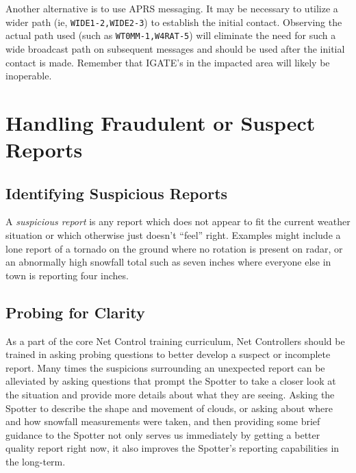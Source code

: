 \documentclass[pdflatex,letterpaper,twoside,12pt]{book}
\begin{document}
Another alternative is to use APRS messaging.  It may be necessary to utilize a wider path (ie, \verb|WIDE1-2,WIDE2-3|) to establish the initial contact.  Observing the actual path used (such as \verb|WT0MM-1,W4RAT-5|) will eliminate the need for such a wide broadcast path on subsequent messages and should be used after the initial contact is made.  Remember that IGATE's in the impacted area will likely be inoperable.


\section{Handling Fraudulent or Suspect Reports}

\subsection{Identifying Suspicious Reports}

A \emph{suspicious report} is any report which does not appear to fit the current weather situation or which otherwise just doesn't ``feel'' right.  Examples might include a lone report of a tornado on the ground where no rotation is present on radar, or an abnormally high snowfall total such as seven inches where everyone else in town is reporting four inches.


\subsection{Probing for Clarity}

As a part of the core Net Control training curriculum, Net Controllers should be trained in asking probing questions to better develop a suspect or incomplete report.  Many times the suspicions surrounding an unexpected report can be alleviated by asking questions that prompt the Spotter to take a closer look at the situation and provide more details about what they are seeing.  Asking the Spotter to describe the shape and movement of clouds, or asking about where and how snowfall measurements were taken, and then providing some brief guidance to the Spotter not only serves us immediately by getting a better quality report right now, it also improves the Spotter's reporting capabilities in the long-term.
\end{document}
